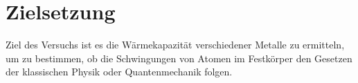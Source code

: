 
\section{Zielsetzung}
\label{sec:Zielsetzung}

Ziel des Versuchs ist es die Wärmekapazität verschiedener Metalle zu ermitteln, um zu bestimmen, ob die Schwingungen von Atomen im Festkörper den Gesetzen der klassischen Physik oder Quantenmechanik folgen.